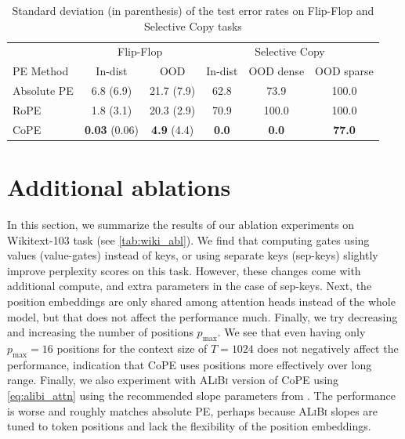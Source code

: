 \documentclass{article}
\newcommand{\ours}{CoPE\xspace}
\newcommand{\std}[1]{\small (#1)}
\begin{document}
\begin{table}[t]
  \centering
  \caption{Standard deviation (in parenthesis) of the test error rates on Flip-Flop and Selective Copy tasks} %
  \vspace{2mm}
  \label{tab:flipflop_std}
  \begin{tabular}{lccccc}
    \toprule
    & \multicolumn{2}{c}{Flip-Flop} & \multicolumn{3}{c}{Selective Copy}\\
    \cmidrule(lr){2-3} \cmidrule(lr){4-6} 
    PE Method   &  In-dist & OOD   &  In-dist & OOD dense & OOD sparse   \\
    \midrule
    Absolute PE  & 6.8 \std{6.9} & 21.7 \std{7.9} & 62.8 & \phantom{0}73.9 & 100.0 \\
    RoPE & 1.8 \std{3.1} & 20.3 \std{2.9} & 70.9 & 100.0 & 100.0 \\
    \ours  & {\bf 0.03} \std{0.06} & {\phantom{0}\bf 4.9} \std{4.4} & \phantom{0}\bf0.0 & \phantom{00}\bf0.0 & \phantom{0}\bf77.0\\
    \bottomrule
  \end{tabular}
\end{table}
\fi

\section{Additional ablations}
\label{app:abbl}
In this section, we summarize the results of our ablation experiments on Wikitext-103 task (see \cref{tab:wiki_abl}). We find that computing gates using values (value-gates) instead of keys, or using separate keys (sep-keys) slightly improve perplexity scores on this task.
However, these changes come with additional compute, and extra parameters in the case of sep-keys.
Next, the position embeddings are only shared among attention heads instead of the whole model, but that does not affect the performance much.
Finally, we try decreasing and increasing the number of positions $p_\text{max}$.
We see that even having only $p_\text{max}=16$ positions for the context size of $T=1024$ does not negatively affect the performance, indication that \ours{} uses positions more effectively over long range.
Finally, we also experiment with \textsc{ALiBi} version of \ours{} using \cref{eq:alibi_attn} using the recommended slope parameters from \cite{press2021train}.
The performance is worse and roughly matches absolute PE, perhaps because \textsc{ALiBi} slopes are tuned to token positions and lack the flexibility of the position embeddings.
\end{document}
